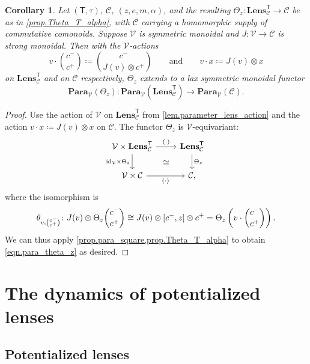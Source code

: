 \documentclass[11pt, oneside, article]{memoir}
\theoremstyle{definition}
\theoremstyle{plain}
\newtheorem{corollary}[corollary]{Corollary}
\DeclarePairedDelimiter{\ihom}{[}{]}
\newcommand{\cat}[1]{\mathcal{#1}}%
\newcommand{\Cat}[1]{\mathbf{#1}}%
\newcommand{\Fun}[1]{\mathsf{#1}}%
\newcommand{\id}{\mathrm{id}}
\newcommand{\qqand}{\qquad\text{and}\qquad}
\newcommand{\Para}{\Cat{Para}}
\newcommand{\para}[2]{\Para_{#1}(#2)}
\newcommand{\Lens}[1]{\Cat{Lens}_{#1}}
\newcommand{\inpt}[1]{#1^{-}}
\newcommand{\outp}[1]{#1^{+}}
\newcommand{\lensob}[1]{\binom{\inpt{#1}}{\outp{#1}}}%
\begin{document}
\begin{corollary}\label{cor.parameterized_representation}
Let $(\Fun T,\tau)$, $\cat C$, $(z,e,m,\alpha)$, and the resulting $\Theta_z\colon\Lens{\cat{C}}^\Fun{T}\to\cat{C}$ be as in \cref{prop.Theta_T_alpha}, with $\cat C$ carrying a homomorphic supply of commutative comonoids. Suppose $\cat V$ is symmetric monoidal and $J\colon\cat V\to\cat C$ is strong monoidal. Then with the $\cat V$-actions
\[
v\cdot\lensob c\coloneqq\binom{\inpt c}{J(v)\otimes\outp c}
\qqand
v\cdot x\coloneqq J(v)\otimes x
\]
on $\Lens{\cat C}^{\Fun T}$ and on $\cat C$ respectively, $\Theta_z$ extends to a lax symmetric monoidal functor
\begin{equation}\label{eqn.para_theta_z}
\para{\cat V}{\Theta_z}\colon\para{\cat V}{\Lens{\cat C}^{\Fun T}}\to\para{\cat V}{\cat C}.
\end{equation}
\end{corollary}

\begin{proof}
Use the action of $\cat{V}$ on $\Lens{\cat C}^{\Fun T}$ from \cref{lem.parameter_lens_action} and the action $v\cdot x\coloneqq J(v)\otimes x$ on $\cat C$. The functor $\Theta_z$ is $\cat V$-equivariant:
\[
\begin{tikzcd}[ampersand replacement=\&]
\cat V\times\Lens{\cat C}^{\Fun T}
  \ar[r,"(\cdot)"]
  \ar[d,"\id_{\cat V}\times\Theta_z"']
  \ar[dr,phantom,"\cong"]
\& \Lens{\cat C}^{\Fun T}\ar[d,"\Theta_z"]\\
\cat V\times\cat C
  \ar[r,"(\cdot)"']
\& \cat C,
\end{tikzcd}
\]
where the isomorphism is
\[
\theta_{v,\lensob c}\colon
J(v)\otimes\Theta_z\lensob c
\cong J(v)\otimes\ihom{\inpt c,z}\otimes\outp c
=\Theta_z\left(v\cdot\lensob c\right).
\]
We can thus apply \cref{prop.para_square,prop.Theta_T_alpha} to obtain \eqref{eqn.para_theta_z} as desired.
\end{proof}

\section{The dynamics of potentialized lenses}\label{sec.potential_lenses_to_dynamics}

\subsection{Potentialized lenses}\label{subsec.potentialized_lenses}
\end{document}
